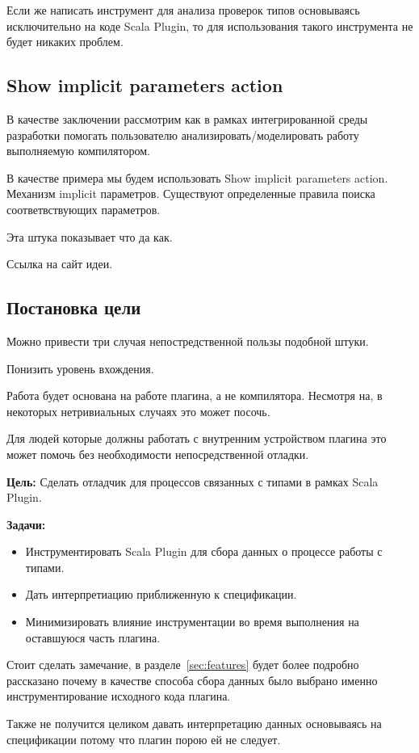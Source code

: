 Если же написать инструмент для анализа проверок типов основываясь исключительно
на коде Scala Plugin, то для использования такого инструмента не будет никаких
проблем.

\subsection{Show implicit parameters action}
\label{sec:showImplicit}

В качестве заключении рассмотрим как в рамках интегрированной среды
разработки помогать пользователю анализировать/моделировать работу выполняемую
компилятором.

В качестве примера мы будем использовать Show implicit parameters action.
Механизм implicit параметров.
Существуют определенные правила поиска соответвствующих параметров.

Эта штука показывает что да как.

Ссылка на сайт идеи.

\subsection{Постановка цели}

Можно привести три случая непостредственной пользы подобной штуки.

Понизить уровень вхождения.

Работа будет основана на работе плагина, а не компилятора.
Несмотря на, в некоторых нетривиальных случаях это может посочь.

Для людей которые должны работать с внутренним устройством плагина это может
помочь без необходимости непосредственной отладки.

\textbf{Цель:}
Сделать отладчик для процессов связанных с типами в рамках Scala Plugin.

\textbf{Задачи:}
\begin{itemize}
  \item Инструментировать Scala Plugin для сбора данных о процессе работы с типами.
  \item Дать интерпретиацию приближенную к спецификации.
  \item Минимизировать влияние инструментации во время выполнения на оставшуюся
  часть плагина.
\end{itemize}

Стоит сделать замечание, в разделе~\ref{sec:features} будет более подробно
рассказано почему в качестве способа сбора данных было выбрано именно
инструментирование исходного кода плагина.

Также не получится целиком давать интерпретацию данных основываясь на спецификации
потому что плагин порою ей не следует.
